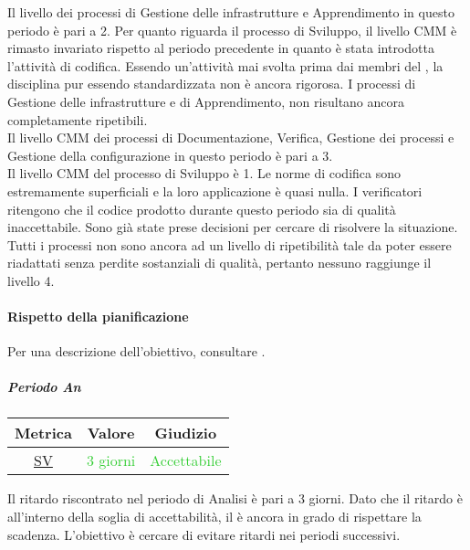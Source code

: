 Il livello  dei processi di Gestione delle infrastrutture e Apprendimento in questo periodo è pari a 2.
Per quanto riguarda il processo di Sviluppo, il livello CMM è rimasto invariato rispetto al periodo precedente in quanto è stata introdotta l'attività di codifica. Essendo un'attività mai svolta prima dai membri del , la disciplina pur essendo standardizzata non è ancora rigorosa.
I processi di Gestione delle infrastrutture e di Apprendimento, non risultano ancora completamente ripetibili.\\
Il livello CMM dei processi di Documentazione, Verifica, Gestione dei processi e Gestione della configurazione in questo periodo è pari a 3.\\
Il livello CMM del processo di Sviluppo è 1. Le norme di codifica sono estremamente superficiali e la loro applicazione è quasi nulla. I verificatori ritengono che il codice prodotto durante questo periodo sia di qualità inaccettabile. Sono già state prese decisioni per cercare di risolvere la situazione.\\
Tutti i processi non sono ancora ad un livello di ripetibilità tale da poter essere riadattati senza perdite sostanziali di qualità, pertanto nessuno raggiunge il livello 4.

\newpage

			\paragraph{Rispetto della pianificazione}
			Per una descrizione dell'obiettivo, consultare .
			\label{RRDP}
			
				\subparagraph{Periodo An}
					\begin{table}[H]
						\centering
						\begin{tabular}{  c | c | c}
							\hline
							\textbf{Metrica} & \textbf{Valore} & \textbf{Giudizio} \\
							\hline
							\hyperref[MRDB]{SV}    & \textcolor{LimeGreen}{3 giorni}      & \textcolor{LimeGreen}{Accettabile}  \\\hline
						\end{tabular}
					\end{table}
				
					Il ritardo riscontrato nel periodo di Analisi è pari a 3 giorni. Dato che il ritardo è all'interno della soglia di accettabilità, il  è ancora in grado di rispettare la scadenza. L'obiettivo è cercare di evitare ritardi nei periodi successivi.
			
